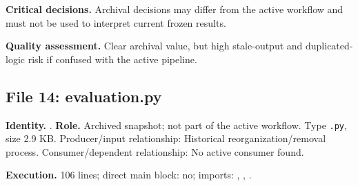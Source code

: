 \documentclass[
  11pt,
  a4paper]{article}
\begin{document}
\textbf{Critical decisions.} Archival decisions may differ from the
active workflow and must not be used to interpret current frozen
results.

\textbf{Quality assessment.} Clear archival value, but high stale-output
and duplicated-logic risk if confused with the active pipeline.

\subsection{File 14: evaluation.py}\label{file-2215445907360820420}

\textbf{Identity.}
.
\textbf{Role.} Archived snapshot; not part of the active workflow. Type
\texttt{.py}, size 2.9 KB. Producer/input relationship: Historical
reorganization/removal process. Consumer/dependent relationship: No
active consumer found.

\textbf{Execution.} 106 lines; direct main block: no; imports:
, ,
.
\end{document}
